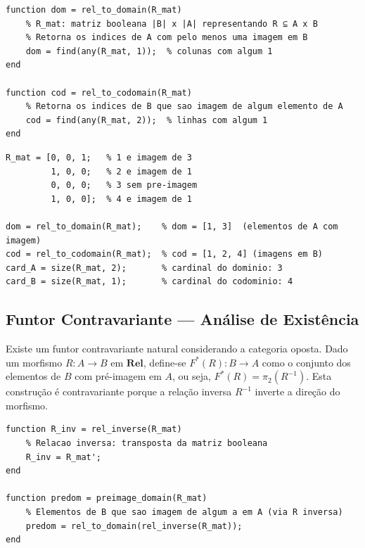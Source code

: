 \begin{lstlisting}[style=matlab, caption={Funtor de domínio $F: \mathbf{Rel} \to \mathbf{Fin}$ --- projeção sobre o domínio}]
function dom = rel_to_domain(R_mat)
    % R_mat: matriz booleana |B| x |A| representando R ⊆ A x B
    % Retorna os indices de A com pelo menos uma imagem em B
    dom = find(any(R_mat, 1));  % colunas com algum 1
end

function cod = rel_to_codomain(R_mat)
    % Retorna os indices de B que sao imagem de algum elemento de A
    cod = find(any(R_mat, 2));  % linhas com algum 1
end
\end{lstlisting}

\begin{lstlisting}[style=matlab, caption={Exemplo: aplicação do funtor a uma relação binária $R \subseteq \{1,2,3\} \times \{1,2,3,4\}$}]
% Relacao R: 1->2, 1->4, 3->1 (elemento 2 sem imagem)
R_mat = [0, 0, 1;   % 1 e imagem de 3
         1, 0, 0;   % 2 e imagem de 1
         0, 0, 0;   % 3 sem pre-imagem
         1, 0, 0];  % 4 e imagem de 1

dom = rel_to_domain(R_mat);    % dom = [1, 3]  (elementos de A com imagem)
cod = rel_to_codomain(R_mat);  % cod = [1, 2, 4] (imagens em B)
card_A = size(R_mat, 2);       % cardinal do dominio: 3
card_B = size(R_mat, 1);       % cardinal do codominio: 4
\end{lstlisting}

\subsection{Funtor Contravariante --- Análise de Existência}

\begin{proposition}
Existe um funtor contravariante natural considerando a categoria oposta. Dado um morfismo $R: A \to B$ em $\mathbf{Rel}$, define-se $F^*(R): B \to A$ como o conjunto dos elementos de $B$ com pré-imagem em $A$, ou seja, $F^*(R) = \pi_2(R^{-1})$. Esta construção é contravariante porque a relação inversa $R^{-1}$ inverte a direção do morfismo.
\end{proposition}

\begin{lstlisting}[style=matlab, caption={Funtor contravariante $F^*: \mathbf{Rel}^{\mathrm{op}} \to \mathbf{Fin}$ via relação transposta}]
function R_inv = rel_inverse(R_mat)
    % Relacao inversa: transposta da matriz booleana
    R_inv = R_mat';
end

function predom = preimage_domain(R_mat)
    % Elementos de B que sao imagem de algum a em A (via R inversa)
    predom = rel_to_domain(rel_inverse(R_mat));
end
\end{lstlisting}

